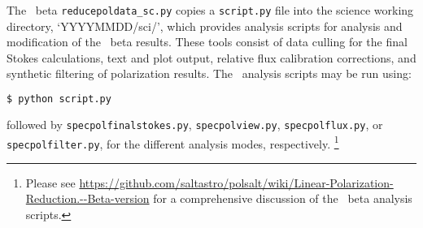 The \polsalt\ beta \texttt{reducepoldata\_sc.py} copies a \texttt{script.py} file into the science working directory, `YYYYMMDD/sci/', which provides analysis scripts for analysis and modification of the \polsalt\ beta results. These tools consist of data culling for the final Stokes calculations, text and plot output, relative flux calibration corrections, and synthetic filtering of polarization results. The \polsalt\ analysis scripts may be run using:
\begin{lstlisting}[language=bash]
$ python script.py
\end{lstlisting}
{\parskip=0pt followed} by \texttt{specpolfinalstokes.py}, \texttt{specpolview.py}, \texttt{specpolflux.py}, or \texttt{specpol\-filter.py}, for the different analysis modes, respectively.%
\footnote{Please see \url{https://github.com/saltastro/polsalt/wiki/Linear-Polarization-Reduction.--Beta-version} for a comprehensive discussion of the \polsalt\ beta analysis scripts.}
